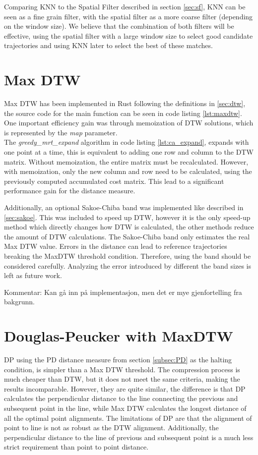 Comparing KNN to the Spatial Filter described in section \ref{sec:sf}, KNN can be seen as a fine grain filter, with the spatial filter as a more coarse filter (depending on the window size). We believe that the combination of both filters will be effective, using the spatial filter with a large window size to select good candidate trajectories and using KNN later to select the best of these matches.

\section{Max DTW}
\label{sec:dtw_impl}
Max DTW has been implemented in Rust following the definitions in \ref{sec:dtw}, the source code for the main function can be seen in code listing \ref{lst:maxdtw}. One important efficiency gain was through memoization of DTW solutions, which is represented by the \textit{map} parameter. \\ The \textit{greedy\_mrt\_expand} algorithm in code listing \ref{lst:ca_expand}, expands with one point at a time, this is equivalent to adding one row and column to the DTW matrix. Without memoization, the entire matrix must be recalculated. However, with memoization, only the new column and row need to be calculated, using the previously computed accumulated cost matrix. This lead to a significant performance gain for the distance measure.

Additionally, an optional Sakoe-Chiba band was implemented like described in \ref{sec:sakoe}. This was included to speed up DTW, however it is the only speed-up method which directly changes how DTW is calculated, the other methods reduce the amount of DTW calculations. The Sakoe-Chiba band only estimates the real Max DTW value. Errors in the distance can lead to reference trajectories breaking the MaxDTW threshold condition. Therefore, using the band should be considered carefully. Analyzing the error introduced by different the band sizes is left as future work.



Kommentar: Kan gå inn på implementasjon, men det er mye gjenfortelling fra bakgrunn.

\section{Douglas-Peucker with MaxDTW}
DP using the PD distance measure from section \ref{subsec:PD} as the halting condition, is simpler than a Max DTW threshold. The compression process is much cheaper than DTW, but it does not meet the same criteria, making the results incomparable. However, they are quite similar, the difference is that DP calculates the perpendicular distance to the line connecting the previous and subsequent point in the line, while Max DTW calculates the longest distance of all the optimal point alignments. The limitations of DP are that the alignment of point to line is not as robust as the DTW alignment. Additionally, the perpendicular distance to the line of previous and subsequent point is a much less strict requirement than point to point distance.

